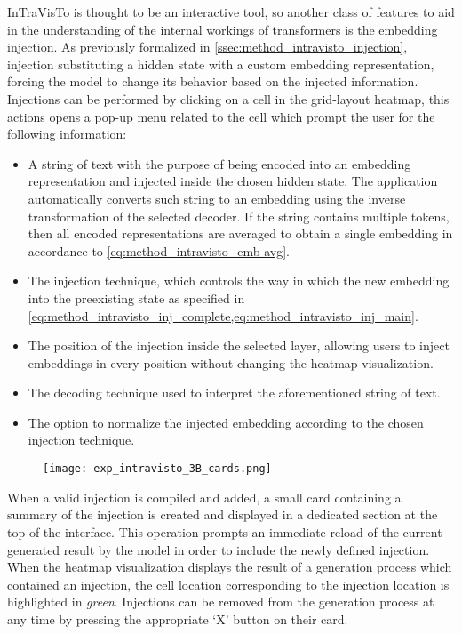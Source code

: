 InTraVisTo is thought to be an interactive tool, so another class of features to aid in the understanding of the internal workings of transformers is the embedding injection.
As previously formalized in \cref{ssec:method_intravisto_injection}, injection  substituting a hidden state with a custom embedding representation, forcing the model to change its behavior based on the injected information.
Injections can be performed by clicking on a cell in the grid-layout heatmap, this actions opens a pop-up menu related to the cell which prompt the user for the following information:
\begin{itemize}
    \item A string of text with the purpose of being encoded into an embedding representation and injected inside the chosen hidden state.
The application automatically converts such string to an embedding using the inverse transformation of the selected decoder.
If the string contains multiple tokens, then all encoded representations are averaged to obtain a single embedding in accordance to \cref{eq:method_intravisto_emb-avg}.
    \item The injection technique, which controls the way in which the new embedding  into the preexisting state as specified in \cref{eq:method_intravisto_inj_complete,eq:method_intravisto_inj_main}.
    \item The position of the injection inside the selected layer, allowing users to inject embeddings in every position without changing the heatmap visualization.
    \item The decoding technique used to interpret the aforementioned string of text.
    \item The option to normalize the injected embedding according to the chosen injection technique. 
\end{itemize}

\begin{figure}[t!]
    \centering
    \texttt{[image: exp\_intravisto\_3B\_cards.png]}
    \caption{}
    \label{fig:exp_intravisto_3_B}
\end{figure}

When a valid injection is compiled and added, a small card containing a summary of the injection is created and displayed in a dedicated section at the top of the interface.
This operation prompts an immediate reload of the current generated result by the model in order to include the newly defined injection.
When the heatmap visualization displays the result of a generation process which contained an injection, the cell location corresponding to the injection location is highlighted in \emph{green}.
Injections can be removed from the generation process at any time by pressing the appropriate `X' button on their card.

